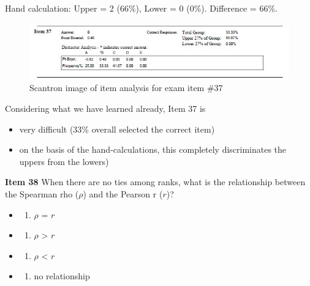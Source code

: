 \documentclass[
  english,
]{book}
\providecommand{\tightlist}{%
  \setlength{\itemsep}{0pt}\setlength{\parskip}{0pt}}
\begin{document}
Hand calculation: Upper = 2 (66\%), Lower = 0 (0\%). Difference = 66\%.

\begin{figure}
\centering
\includegraphics{images/ItemAnalExam/Item37.jpg}
\caption{Scantron image of item analysis for exam item \#37}
\end{figure}

Considering what we have learned already, Item 37 is

\begin{itemize}
\tightlist
\item
  very difficult (33\% overall selected the correct item)
\item
  on the basis of the hand-calculations, this completely discriminates the uppers from the lowers)
\end{itemize}

\textbf{Item 38} When there are no ties among ranks, what is the relationship between the Spearman rho (\(\rho\)) and the Pearson r (\(r\))?

\begin{itemize}
\item
  \begin{enumerate}
  \def\labelenumi{\alph{enumi})}
  \tightlist
  \item
    \(\rho\) = \(r\)
  \end{enumerate}
\item
  \begin{enumerate}
  \def\labelenumi{\roman{enumi})}
  \setcounter{enumi}{1}
  \tightlist
  \item
    \(\rho\) \textgreater{} \(r\)
  \end{enumerate}
\item
  \begin{enumerate}
  \def\labelenumi{\alph{enumi})}
  \tightlist
  \item
    \(\rho\) \textless{} \(r\)
  \end{enumerate}
\item
  \begin{enumerate}
  \def\labelenumi{\alph{enumi})}
  \setcounter{enumi}{1}
  \tightlist
  \item
    no relationship
  \end{enumerate}
\end{itemize}
\end{document}
